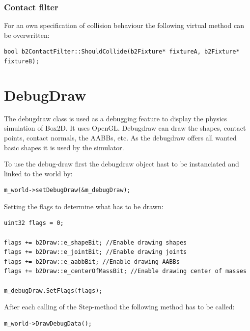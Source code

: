 \documentclass[10pt,a4paper,DIV=11]{scrreprt}
\begin{document}
\subsubsection*{Contact filter}
For an own specification of collision behaviour the following virtual method can be overwritten: \\
\begin{lstlisting}[caption={The contact filter method},label=lst:box2d-contactfiler]
bool b2ContactFilter::ShouldCollide(b2Fixture* fixtureA, b2Fixture* fixtureB);
\end{lstlisting}


\section{DebugDraw}
The debugdraw class is used as a debugging feature to display the physics simulation of Box2D. It uses OpenGL. Debugdraw can draw the shapes, contact points, contact normals, the AABBs, etc.
As the debugdraw offers all wanted basic shapes it is used by the simulator.

To use the debug-draw first the debugdraw object hast to be instanciated and linked to the world by: \\

\begin{lstlisting}[caption={Linking debugdraw instance to the world instance},label=lst:box2d-ddrawset]
m_world->setDebugDraw(&m_debugDraw);
\end{lstlisting}

Setting the flags to determine what has to be drawn:

\begin{lstlisting}[caption={Initializing DebugDraw},label=lst:box2d-ddrawinit]
uint32 flags = 0;

flags += b2Draw::e_shapeBit; //Enable drawing shapes
flags += b2Draw::e_jointBit; //Enable drawing joints
flags += b2Draw::e_aabbBit; //Enable drawing AABBs
flags += b2Draw::e_centerOfMassBit; //Enable drawing center of masses

m_debugDraw.SetFlags(flags);
\end{lstlisting}


After each calling of the Step-method the following method has to be called: \\

\begin{lstlisting}[caption={Using debugdraw after each step},label=lst:box2d-ddraw]
m_world->DrawDebugData();
\end{lstlisting}
 
\end{document}
